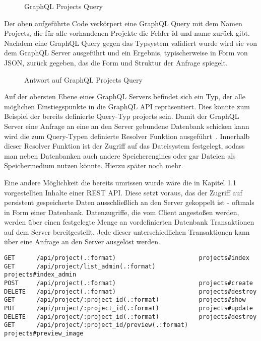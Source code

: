 \begin{figure}[h]
    
    \caption{GraphQL Projects Query}
    \label{fig:basics:graphql:4}
\end{figure}

Der oben aufgeführte Code verkörpert eine GraphQL Query mit dem Namen Projects, die für alle vorhandenen Projekte die Felder id und name
zurück gibt. Nachdem eine GraphQL Query gegen das Typsystem validiert wurde wird sie von dem GraphQL Server ausgeführt und
ein Ergebnis, typischerweise in Form von JSON, zurück gegeben, das die Form und Struktur der Anfrage spiegelt.

\begin{figure}[h]
    
    \caption{Antwort auf GraphQL Projects Query}
    \label{fig:basics:graphql:5}
\end{figure}

Auf der obersten Ebene eines GraphQL Servers befindet sich ein Typ, der alle möglichen Einstiegspunkte in die GraphQL API repräsentiert.
Dies könnte zum Beispiel der bereits definierte Query-Typ projects sein.
Damit der GraphQL Server eine Anfrage an eine an den Server gebundene Datenbank schicken kann wird die zum Query-Typen definierte
Resolver Funktion ausgeführt~\cite{graphql-execution}. Innerhalb dieser Resolver Funktion ist der Zugriff auf das Dateisystem festgelegt, sodass
man neben Datenbanken auch andere Speicherengines oder gar Dateien als Speichermedium nutzen könnte.
Hierzu später noch mehr.

Eine andere Möglichkeit die bereits umrissen wurde wäre die in Kapitel 1.1 vorgestellten Inhalte einer REST API.
Diese setzt voraus, das der Zugriff auf persistent gespeicherte Daten ausschließlich an den Server gekoppelt ist - oftmals in Form einer Datenbank.
Datenzugriffe, die vom Client angestoßen werden, werden über einen festgelegte Menge an vordefinierten Datenbank Transaktionen auf dem Server bereitgestellt.
Jede dieser unterschiedlichen Transaktionen kann über eine Anfrage an den Server ausgelöst werden.

\begin{lstlisting}
GET      /api/project(.:format)                       projects#index
GET      /api/project/list_admin(.:format)            projects#index_admin
POST     /api/project(.:format)                       projects#create
DELETE   /api/project(.:format)                       projects#destroy
GET      /api/project/:project_id(.:format)           projects#show
PUT      /api/project/:project_id(.:format)           projects#update
DELETE   /api/project/:project_id(.:format)           projects#destroy
GET      /api/project/:project_id/preview(.:format)   projects#preview_image
\end{lstlisting}


